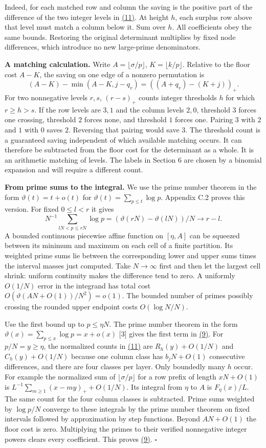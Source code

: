 \documentclass[11pt,a4paper]{article}
\newcounter{none}
\begin{document}
Indeed, for each matched row and column the saving is the positive part of the difference of the two integer levels in \hyperref[eq:11]{(11)}. At height \(h\), each surplus row above that level must match a column below it. Sum over \(h\). All coefficients obey the same bounds. Restoring the original determinant multiplies by fixed node differences, which introduce no new large-prime denominators.

\textbf{A matching calculation.} Write \(A=\lfloor\sigma/p\rfloor\), \(K=\lfloor k/p\rfloor\). Relative to the floor cost \(A-K\), the saving on one edge of a nonzero permutation is \[
 (A-K)-\min(A-K,j-q_v)=((A+q_v)-(K+j))_+ .
\] For two nonnegative levels \(r,s\), \((r-s)_+\) counts integer thresholds \(h\) for which \(r\ge h>s\). If the row levels are \(3,1\) and the column levels \(2,0\), threshold \(3\) forces one crossing, threshold \(2\) forces none, and threshold \(1\) forces one. Pairing \(3\) with \(2\) and \(1\) with \(0\) saves \(2\). Reversing that pairing would save \(3\). The threshold count is a guaranteed saving independent of which available matching occurs. It can therefore be subtracted from the floor cost for the determinant as a whole. It is an arithmetic matching of levels. The labels in Section 6 are chosen by a binomial expansion and will require a different count.

\textbf{From prime sums to the integral.} We use the prime number theorem in the form \(\vartheta(t)=t+o(t)\) for \(\vartheta(t)=\sum_{p\le t}\log p\). Appendix C.2 proves this version. For fixed \(0\le l<r\) it gives \[
 N^{-1}\sum_{lN<p\le rN}\log p=(\vartheta(rN)-\vartheta(lN))/N\longrightarrow r-l .
\] A bounded continuous piecewise affine function on \([\eta,A]\) can be squeezed between its minimum and maximum on each cell of a finite partition. Its weighted prime sums lie between the corresponding lower and upper sums times the interval masses just computed. Take \(N\to\infty\) first and then let the largest cell shrink: uniform continuity makes the difference tend to zero. A uniformly \(O(1/N)\) error in the integrand has total cost \(O(\vartheta(AN+O(1))/N^2)=o(1)\). The bounded number of primes possibly crossing the rounded upper endpoint costs \(O(\log N/N)\).

Use the first bound up to \(p\le\eta N\). The prime number theorem in the form \(\vartheta(x)=\sum_{p\le x}\log p=x+o(x)\) {[}3{]} gives the first term in \hyperref[eq:9]{(9)}. For \(p/N=y\ge\eta\), the normalized counts in \hyperref[eq:11]{(11)} are \(R_h(y)+O(1/N)\) and \(C_h(y)+O(1/N)\) because one column class has \(b_jN+O(1)\) consecutive differences, and there are four classes per layer. Only boundedly many \(h\) occur. For example the normalized sum of \(\lfloor\sigma/p\rfloor\) for a row prefix of length \(xN+O(1)\) is \(L^{-1}\sum_{m\ge1}(x-my)_++O(1/N)\). Its integral from \(\eta\) to \(A\) is \(F_\eta(x)/L\). The same count for the four column classes is subtracted. Prime sums weighted by \(\log p/N\) converge to these integrals by the prime number theorem on fixed intervals followed by approximation by step functions. Beyond \(AN+O(1)\) the floor cost is zero. Multiplying the primes to their verified nonnegative integer powers clears every coefficient. This proves \hyperref[eq:9]{(9)}. \(\square\)
\end{document}
